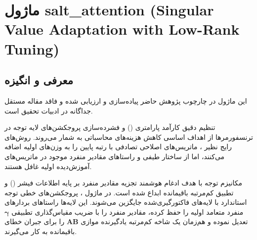 \section{ماژول salt\_attention (Singular Value Adaptation with Low-Rank Tuning)}
\label{sec:module_salt_attention}

\subsection{معرفی و انگیزه}
این ماژول در چارچوب پژوهش حاضر پیاده‌سازی و ارزیابی شده و فاقد مقاله مستقل جداگانه در ادبیات تحقیق است.

تنظیم دقیق کارآمد پارامتری () و فشرده‌سازی پروجکشن‌های لایه توجه در ترنسفورمرها از اهداف اساسی کاهش هزینه‌های محاسباتی به شمار می‌روند. روش‌های رایج نظیر ، ماتریس‌های اصلاحی تصادفی با رتبه پایین را به وزن‌های اولیه اضافه می‌کنند، اما از ساختار طیفی و راستاهای مقادیر منفرد موجود در ماتریس‌های آموزش‌دیده اولیه غافل هستند.

مکانیزم توجه  با هدف ادغام هوشمند تجزیه مقادیر منفرد بر پایه اطلاعات فیشر () و تطبیق کم‌مرتبه باقیمانده ابداع شده است. در ماژول ، پروجکشن‌های خطی توجه استاندارد با لایه‌های فاکتورگیری‌شده  جایگزین می‌شوند. این لایه‌ها راستاهای بردارهای منفرد متعامد اولیه را حفظ کرده، مقادیر منفرد را با ضریب مقیاس‌گذاری تطبیقی $\boldsymbol{\gamma}$ تعدیل نموده و هم‌زمان یک شاخه کم‌مرتبه یادگیرنده موازی $\mathbf{A} \mathbf{B}$ را برای جبران خطای باقیمانده به کار می‌گیرند.

